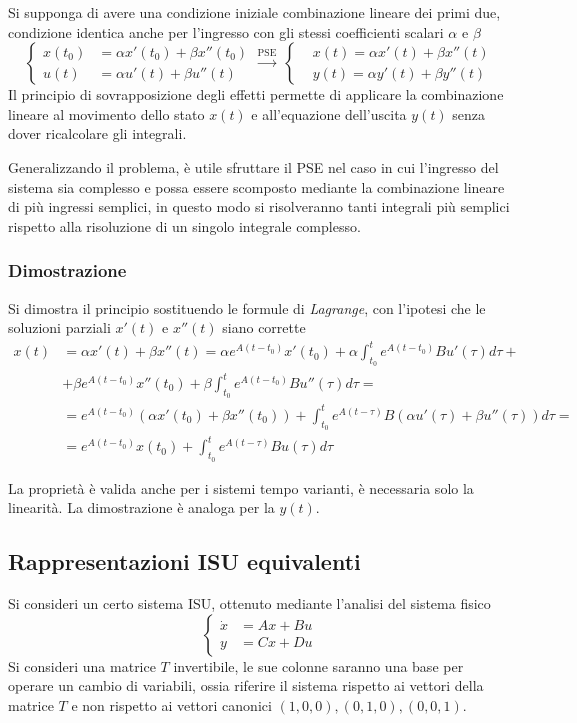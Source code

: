 Si supponga di avere una condizione iniziale combinazione lineare dei primi
due, condizione identica anche per l'ingresso con gli stessi coefficienti
scalari $\alpha$ e $\beta$
$$\left\{\begin{aligned}
x(t_0) &= \alpha x'(t_0) + \beta x''(t_0)\\
u(t) &= \alpha u'(t) + \beta u''(t)
\end{aligned}\right.\stackrel{\text{PSE}}{\longrightarrow}\
\left\{\begin{aligned}
&x(t) = \alpha x'(t) + \beta x''(t)\\
&y(t) = \alpha y'(t) + \beta y''(t)
\end{aligned}\right.
$$
Il principio di sovrapposizione degli effetti permette di applicare la
combinazione lineare al movimento dello stato $x(t)$ e all'equazione
dell'uscita $y(t)$ senza dover ricalcolare gli integrali.

Generalizzando il problema, è utile sfruttare il PSE nel caso in cui l'ingresso
del sistema sia complesso e possa essere scomposto mediante la combinazione
lineare di più ingressi semplici, in questo modo si risolveranno tanti
integrali più semplici rispetto alla risoluzione di un singolo integrale
complesso.

\subsubsection{Dimostrazione}
Si dimostra il principio sostituendo le formule di \textit{Lagrange}, con
l'ipotesi che le soluzioni parziali $x'(t)$ e $x''(t)$ siano corrette
$$\begin{aligned}
x(t) &= \alpha x'(t) + \beta x''(t) = \alpha e^{A(t-t_0)}x'(t_0) + \alpha
\int_{t_0}^t e^{A(t-t_0)}Bu'(\tau)d\tau + \\
 &+ \beta e^{A(t-t_0)}x''(t_0) + \beta\int_{t_0}^t e^{A(t-t_0)} B
u''(\tau)d\tau =\\
&= e^{A(t-t_0)}\left(\alpha x'(t_0) + \beta x''(t_0)\right) + \int_{t_0}^t
e^{A(t-\tau)} B \left(\alpha u'(\tau) + \beta u''(\tau)\right) d\tau =\\
&= e^{A(t-t_0)}x(t_0)  + \int_{t_0}^t
e^{A(t-\tau)}Bu(\tau)d\tau
\end{aligned}$$

La proprietà è valida anche per i sistemi tempo varianti, è necessaria solo la
linearità.
La dimostrazione è analoga per la $y(t)$.


\subsection{Rappresentazioni ISU equivalenti}
Si consideri un certo sistema ISU, ottenuto mediante l'analisi del sistema
fisico
$$
\left\{\begin{aligned}
\dot{x} &= Ax + Bu \\
y & = Cx + Du
\end{aligned}\right.
$$
Si consideri una matrice $T$ invertibile, le sue colonne saranno una base per
operare un cambio di variabili, ossia riferire il sistema rispetto ai vettori
della matrice $T$ e non rispetto ai vettori canonici $(1,0,0),(0,1,0),(0,0,1)$.

